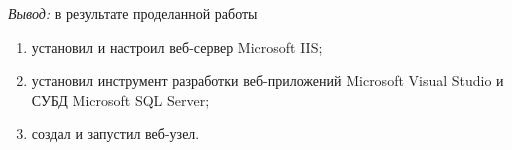 \documentclass[pscyr]{hedlab}
\begin{document}
  \vspace{-1.5em}  
  \emph{Вывод:} в результате проделанной работы
  \vspace{-.5em}  
  \begin{enumerate}
    \itemsep -5pt
    \item установил и настроил веб-сервер Microsoft IIS;
    \item установил инструмент разработки веб-приложений Microsoft Visual
      Studio и СУБД Microsoft SQL Server;
    \item создал и запустил веб-узел.
  \end{enumerate}
\end{document}

